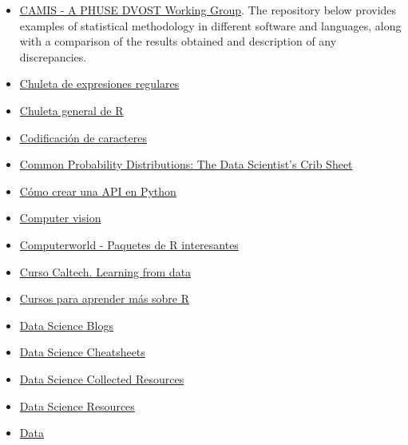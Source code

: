 \documentclass[
  letterpaper,
  DIV=11,
  numbers=noendperiod]{scrartcl}
\begin{document}
\begin{itemize}
{  RStudio}
\item
  \href{https://psiaims.github.io/CAMIS/}{CAMIS - A PHUSE DVOST Working
  Group}. The repository below provides examples of statistical
  methodology in different software and languages, along with a
  comparison of the results obtained and description of any
  discrepancies.
\item
  \href{https://github.com/rstudio/cheatsheets/blob/main/regex.pdf}{Chuleta
  de expresiones regulares}
\item
  \href{https://cran.r-project.org/doc/contrib/Baggott-refcard-v2.pdf}{Chuleta
  general de R}
\item
  \href{https://www.joelonsoftware.com/2003/10/08/the-absolute-minimum-every-software-developer-absolutely-positively-must-know-about-unicode-and-character-sets-no-excuses/}{Codificación
  de caracteres}
\item
  \href{https://blog.cloudera.com/blog/2015/12/common-probability-distributions-the-data-scientists-crib-sheet/?utm_content=buffer49e9f&utm_medium=social&utm_source=facebook.com&utm_campaign=buffer}{Common
  Probability Distributions: The Data Scientist's Crib Sheet}
\item
  \href{https://anderfernandez.com/blog/como-crear-api-en-python/}{Cómo
  crear una API en Python}
\item
  \href{https://github.com/kjw0612/awesome-deep-vision}{Computer vision}
\item
  \href{https://www.computerworld.com/article/1375862/great-r-packages-for-data-import-wrangling-visualization.html}{Computerworld
  - Paquetes de R interesantes}
\item
  \href{https://work.caltech.edu/telecourse.html}{Curso Caltech.
  Learning from data}
\item
  \href{https://datos.gob.es/es/noticia/cursos-para-aprender-mas-sobre-r}{Cursos
  para aprender más sobre R}
\item
  \href{https://github.com/rushter/data-science-blogs}{Data Science
  Blogs}
\item
  \href{https://github.com/FavioVazquez/ds-cheatsheets}{Data Science
  Cheatsheets}
\item
  \href{https://github.com/tirthajyoti/Data-science-best-resources}{Data
  Science Collected Resources}
\item
  \href{https://github.com/jonathan-bower/DataScienceResources}{Data
  Science Resources}
\item
  \href{https://github.com/MrMimic/data-scientist-roadmap}{Data
}
\end{itemize}
\end{document}
